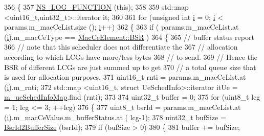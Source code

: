 \begin{DoxyCode}
356 \{
357         \hyperlink{log-macros-disabled_8h_a90b90d5bad1f39cb1b64923ea94c0761}{NS\_LOG\_FUNCTION} (\textcolor{keyword}{this});
358 
359         std::map <uint16\_t,uint32\_t>::iterator it;
360 
361         \textcolor{keywordflow}{for} (\textcolor{keywordtype}{unsigned} \textcolor{keywordtype}{int} \hyperlink{bernuolliDistribution_8m_a6f6ccfcf58b31cb6412107d9d5281426}{i} = 0; \hyperlink{bernuolliDistribution_8m_a6f6ccfcf58b31cb6412107d9d5281426}{i} < params.m\_macCeList.size (); \hyperlink{bernuolliDistribution_8m_a6f6ccfcf58b31cb6412107d9d5281426}{i}++)
362         \{
363                 \textcolor{keywordflow}{if} ( params.m\_macCeList.at (\hyperlink{bernuolliDistribution_8m_a6f6ccfcf58b31cb6412107d9d5281426}{i}).m\_macCeType == \hyperlink{structns3_1_1MacCeElement_a7b68183e7a7fd9b02783f92a2c645d7ba459101d6c51f15c22bfdf75d68f9c631}{MacCeElement::BSR} )
364                 \{
365                         \textcolor{comment}{// buffer status report}
366                         \textcolor{comment}{// note that this scheduler does not differentiate the}
367                         \textcolor{comment}{// allocation according to which LCGs have more/less bytes}
368                         \textcolor{comment}{// to send.}
369                         \textcolor{comment}{// Hence the BSR of different LCGs are just summed up to get}
370                         \textcolor{comment}{// a total queue size that is used for allocation purposes.}
371                         uint16\_t rnti = params.m\_macCeList.at (\hyperlink{bernuolliDistribution_8m_a6f6ccfcf58b31cb6412107d9d5281426}{i}).m\_rnti;
372                 std::map <uint16\_t, struct UeSchedInfo>::iterator itUe = 
      \hyperlink{classns3_1_1MmWaveFlexTtiPfMacScheduler_a3b6dd19d8156d24c8d30cc562843b740}{m\_ueSchedInfoMap}.find (rnti);
373 
374                         uint32\_t buffer = 0;
375                         \textcolor{keywordflow}{for} (uint8\_t lcg = 1; lcg <= 3; ++lcg)
376                         \{
377                                 uint8\_t bsrId = params.m\_macCeList.at (\hyperlink{bernuolliDistribution_8m_a6f6ccfcf58b31cb6412107d9d5281426}{i}).m\_macCeValue.m\_bufferStatus.at (
      lcg-1);
378                                 uint32\_t bufSize = \hyperlink{classns3_1_1MmWaveFlexTtiPfMacScheduler_a6a2af49002a8eb4ba5409c799ca03e38}{BsrId2BufferSize} (bsrId);
379                                 \textcolor{keywordflow}{if} (bufSize > 0)
380                                 \{
381                                         buffer += bufSize;

\end{DoxyCode}
